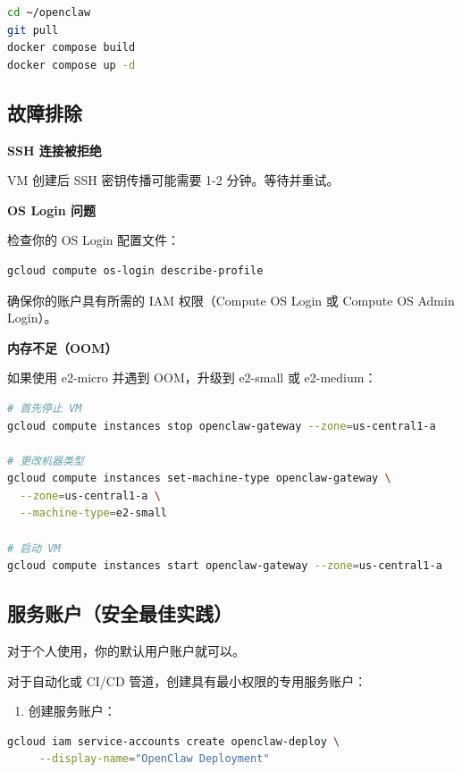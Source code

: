 \begin{lstlisting}[language=bash]
cd ~/openclaw
git pull
docker compose build
docker compose up -d
\end{lstlisting}


\hrulefill


\subsection{故障排除}


\textbf{SSH 连接被拒绝}

VM 创建后 SSH 密钥传播可能需要 1-2 分钟。等待并重试。

\textbf{OS Login 问题}

检查你的 OS Login 配置文件：

\begin{lstlisting}[language=bash]
gcloud compute os-login describe-profile
\end{lstlisting}


确保你的账户具有所需的 IAM 权限（Compute OS Login 或 Compute OS Admin Login）。

\textbf{内存不足（OOM）}

如果使用 e2-micro 并遇到 OOM，升级到 e2-small 或 e2-medium：

\begin{lstlisting}[language=bash]
# 首先停止 VM
gcloud compute instances stop openclaw-gateway --zone=us-central1-a

# 更改机器类型
gcloud compute instances set-machine-type openclaw-gateway \
  --zone=us-central1-a \
  --machine-type=e2-small

# 启动 VM
gcloud compute instances start openclaw-gateway --zone=us-central1-a
\end{lstlisting}


\hrulefill


\subsection{服务账户（安全最佳实践）}


对于个人使用，你的默认用户账户就可以。

对于自动化或 CI/CD 管道，创建具有最小权限的专用服务账户：

\begin{enumerate}
  \item 创建服务账户：
\end{enumerate}


\begin{lstlisting}[language=bash]
   gcloud iam service-accounts create openclaw-deploy \
     --display-name="OpenClaw Deployment"
\end{lstlisting}


